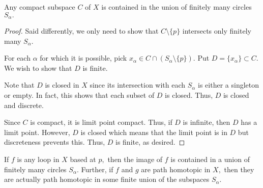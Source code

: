 \documentclass[12pt]{article}
\begin{document}
\begin{prop} \label{prop:compactsubspacefinitecircles}
	Any compact subspace $C$ of $X$ is contained in the union of finitely many circles $S_\alpha.$
\end{prop}
\begin{proof} 
	Said differently, we only need to show that $C\setminus\{p\}$ intersects only finitely many $S_\alpha.$

	For each $\alpha$ for which it is possible, pick $x_\alpha \in C \cap (S_\alpha \setminus \{p\}).$ Put $D = \{x_\alpha\} \subset C.$ We wish to show that $D$ is finite.

	Note that $D$ is closed in $X$ since its intersection with each $S_\alpha$ is either a singleton or empty. In fact, this shows that each subset of $D$ is closed. Thus, $D$ is closed and discrete. 

	Since $C$ is compact, it is limit point compact. Thus, if $D$ is infinite, then $D$ has a limit point. However, $D$ is closed which means that the limit point is in $D$ but discreteness prevents this. Thus, $D$ is finite, as desired.
\end{proof}

\begin{cor} \label{cor:loopimageandhomotopyinwedge}
	If $f$ is any loop in $X$ based at $p,$ then the image of $f$ is contained in a union of finitely many circles $S_\alpha.$ Further, if $f$ and $g$ are path homotopic in $X,$ then they are actually path homotopic in some finite union of the subspaces $S_\alpha.$
\end{cor}
\end{document}
